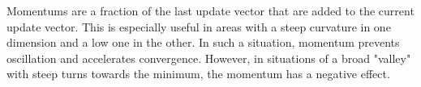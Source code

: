 \documentclass[accentcolor=tud9c]{tudexercise}
\begin{document}
	Momentums are a fraction of the last update vector that are added to the current update vector. This is especially useful in areas with a steep curvature in one dimension and a low one in the other. In such a situation, momentum prevents oscillation and accelerates convergence. However, in situations of a broad "valley" with steep turns towards the minimum, the momentum has a negative effect.
		
\end{document}
